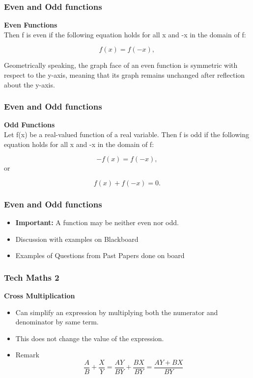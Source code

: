 \documentclass{beamer}
\begin{document}
\begin{frame}
\frametitle{Even and Odd functions}
\Large
\textbf{Even Functions}\\
Then f is even if the following equation holds for all x and -x in the domain of f:

\[f(x) = f(-x), \,\]

Geometrically speaking, the graph face of an even function is symmetric with respect to the y-axis, meaning that its graph remains unchanged after reflection about the y-axis.
\end{frame}
\begin{frame}
\frametitle{Even and Odd functions}
\Large
\textbf{Odd Functions}\\
Let f(x) be a real-valued function of a real variable. Then f is odd if the following equation holds for all x and -x in the domain of f:

\[-f(x) = f(-x), \,\]
or

\[f(x) + f(-x) = 0. \,\]
\end{frame}

\begin{frame}
	\frametitle{Even and Odd functions}
	\begin{itemize}
    \item \textbf{Important:} A function may be neither even nor odd.
	\item Discussion with examples on Blackboard
	\item Examples of Questions from Past Papers done on board
	\end{itemize}
	
\end{frame}
	
\begin{frame}
	\frametitle{Tech Maths 2}
	\textbf{Cross Multiplication}
	\Large 
	\begin{itemize}
		\item Can simplify an expression by multiplying both the numerator and denominator by same term.
		\item This does not change the value of the expression.
		\item Remark
		{
			\LARGE
			\[ \frac{A}{B} + \frac{X}{Y} = \frac{AY}{BY} + \frac{BX}{BY} = \frac{AY+BX}{BY}\]
		}
	\end{itemize}
\end{frame}
\end{document}
